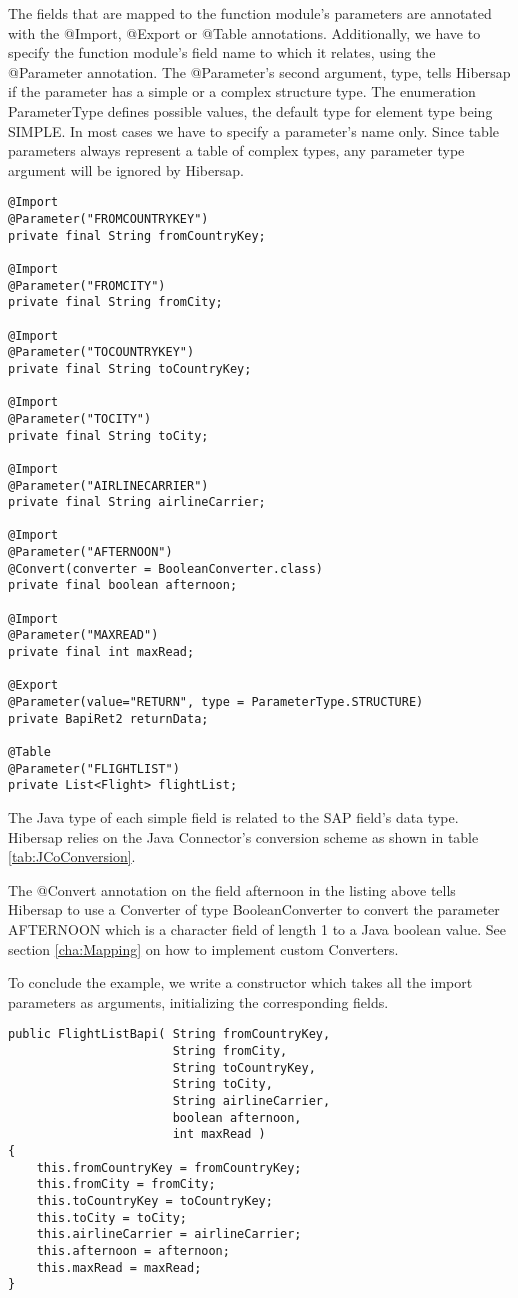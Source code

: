 The fields that are mapped to the function module's parameters are annotated with the
@Import, @Export or @Table annotations.
Additionally, we have to specify the function module's field name
to which it relates, using the @Parameter annotation.
The @Parameter's second argument, type, tells Hibersap if the parameter has a simple or a complex structure type.
The enumeration ParameterType defines possible values, the default type for element type being SIMPLE.
In most cases we have to specify a parameter's name only. Since table parameters always represent
a table of complex types, any parameter type argument will be ignored by Hibersap.

\begin{lstlisting}[caption=The BAPI fields]
@Import
@Parameter("FROMCOUNTRYKEY")
private final String fromCountryKey;

@Import
@Parameter("FROMCITY")
private final String fromCity;

@Import
@Parameter("TOCOUNTRYKEY")
private final String toCountryKey;

@Import
@Parameter("TOCITY")
private final String toCity;

@Import
@Parameter("AIRLINECARRIER")
private final String airlineCarrier;

@Import
@Parameter("AFTERNOON")
@Convert(converter = BooleanConverter.class)
private final boolean afternoon;

@Import
@Parameter("MAXREAD")
private final int maxRead;

@Export
@Parameter(value="RETURN", type = ParameterType.STRUCTURE)
private BapiRet2 returnData;

@Table
@Parameter("FLIGHTLIST")
private List<Flight> flightList;
\end{lstlisting}

The Java type of each simple field is related to the SAP field's data type.
Hibersap relies on the Java Connector's conversion scheme as shown in table \ref{tab:JCoConversion}.

The @Convert annotation on the field afternoon in the listing above tells Hibersap
to use a Converter of type BooleanConverter to convert the parameter AFTERNOON which is a character field of length 1 to a
Java boolean value. See section \ref{cha:Mapping} on how to implement custom Converters.

To conclude the example, we write a constructor which takes all the import parameters as arguments,
initializing the corresponding fields.

\begin{lstlisting}[caption=The constructor]
public FlightListBapi( String fromCountryKey,
                       String fromCity,
                       String toCountryKey,
                       String toCity,
                       String airlineCarrier,
                       boolean afternoon,
                       int maxRead )
{
    this.fromCountryKey = fromCountryKey;
    this.fromCity = fromCity;
    this.toCountryKey = toCountryKey;
    this.toCity = toCity;
    this.airlineCarrier = airlineCarrier;
    this.afternoon = afternoon;
    this.maxRead = maxRead;
}
\end{lstlisting}

